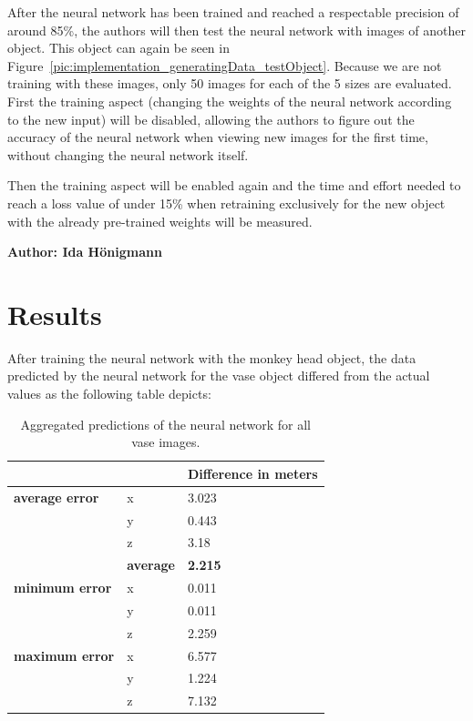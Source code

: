 After the neural network has been trained and reached a respectable precision of around 85\%, the authors will then test the neural network with images of another object. This object can again be seen in Figure~\ref{pic:implementation_generatingData_testObject}. Because we are not training with these images, only 50 images for each of the 5 sizes are evaluated. First the training aspect (changing the weights of the neural network according to the new input) will be disabled, allowing the authors to figure out the accuracy of the neural network when viewing new images for the first time, without changing the neural network itself.

Then the training aspect will be enabled again and the time and effort needed to reach a loss value of under 15\% when retraining exclusively for the new object with the already pre-trained weights will be measured.

\vspace{5mm}
\noindent
\textbf{Author: Ida Hönigmann}

\section{Results}
After training the neural network with the monkey head object, the data predicted by the neural network for the vase object differed from the actual values as the following table depicts:

\begin{table}[h!]
	\begin{tabular}{ll|l}
		&     & \textbf{Difference in meters} \\
		\hline
		\textbf{average error} & x   & 3.023                         \\
		& y   & 0.443                         \\
		& z   & 3.18                          \\
		& \textbf{average} & \textbf{2.215}                         \\
		\hline
		\textbf{minimum error} & x   & 0.011                         \\
		& y   & 0.011                         \\
		& z   & 2.259                         \\
		\hline
		\textbf{maximum error} & x   & 6.577                         \\
		& y   & 1.224                         \\
		& z   & 7.132                                                  
	\end{tabular}
	\caption{Aggregated predictions of the neural network for all vase images.}
\end{table}

